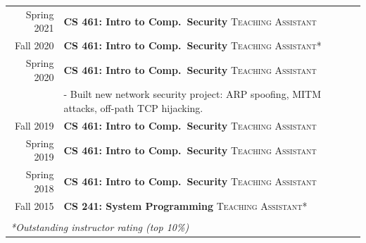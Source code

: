 \documentclass[10pt,singlecolumn]{article} %
\begin{document}
\begin{tabular}{rl}
Spring 2021    & \textbf{CS 461: Intro to Comp.\ Security} \textsc{Teaching Assistant}\\ 
Fall 2020    & \textbf{CS 461: Intro to Comp.\ Security} \textsc{Teaching Assistant*}\\ 
Spring 2020	 & \textbf{CS 461: Intro to Comp.\ Security} \textsc{Teaching Assistant}\\ 
& - Built new network security project: ARP spoofing, MITM attacks, off-path TCP hijacking. \\

Fall 2019	 & \textbf{CS 461: Intro to Comp.\ Security} \textsc{Teaching Assistant}\\
Spring 2019	 & \textbf{CS 461: Intro to Comp.\ Security} \textsc{Teaching Assistant}\\  
Spring 2018	 & \textbf{CS 461: Intro to Comp.\ Security} \textsc{Teaching Assistant}\\ 
Fall 2015	 & \textbf{CS 241: System Programming} \textsc{Teaching Assistant*}\\ \\
\multicolumn{2}{l}{\emph{*Outstanding instructor rating (top 10\%)}}
\end{tabular}\\

\end{document}
